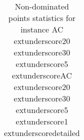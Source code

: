 \begin{table}
\caption{Non-dominated points statistics for instance AC	extunderscore20	extunderscore30	extunderscore5	extunderscoreAC	extunderscore20	extunderscore30	extunderscore5	extunderscore1	extunderscoredetailed}
\label{tab:stats/AC_20_30_5_AC_20_30_5_1_detailed}
\begin{tabular}{}
\toprule
\midrule
\bottomrule
\end{tabular}
\end{table}
